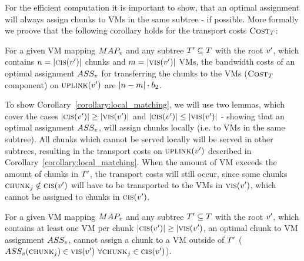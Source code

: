 For the efficient computation it is 
important to show, that an optimal assignment will always assign chunks to VMs 
in the same subtree - if possible. More formally we proove that the following 
corollary holds for the transport costs $\textsc{Cost}_T$:  

\begin{corollary}
\label{corollary:local_matching}
For a given VM mapping $MAP_v$ and any subtree $T' \subseteq 
T$ with the root $v'$, which contains $n = 
|\textsc{cis}(v')|$ chunks and $m = |\textsc{vis}(v')|$ 
VMs, the bandwidth costs of an optimal assignment $ASS_v$ for 
transferring the chunks to the VMs ($\textsc{Cost}_T$ 
component) on $\textsc{uplink}(v')$ are $|n 
- m| \cdot b_2$.
\end{corollary}

To show Corollary~\ref{corollary:local_matching}, we will use two lemmas, which 
cover the cases $|\textsc{cis}(v')| \geq 
|\textsc{vis}(v')|$ and $|\textsc{cis}(v')| \leq 
|\textsc{vis}(v')|$ - showing that an optimal assignment 
$ASS_v$, will assign chunks locally (i.e. to VMs in the 
same subtree). All chunks which cannot be served locally will be served in 
other subtrees, resulting in the transport costs on $\textsc{uplink}(v')$ 
described in Corollary~\ref{corollary:local_matching}. When the amount of VM 
exceeds the amount of chunks in $T'$, the transport costs will still occur, 
since some chunks $\textsc{chunk}_j \notin \textsc{cis}(v')$ will have to 
be transported to the VMs in $\textsc{vis}(v')$, which cannot be 
assigned to chunks in $\textsc{cis}(v')$.

\begin{lemma}
\label{lemma:matching1}
For a given VM mapping $MAP_v$ and any subtree $T' \subseteq 
T$ with the root $v'$, which contains at least one VM per 
chunk $|\textsc{cis}(v')| \geq |\textsc{vis}(v')$, an 
optimal chunk to VM assignment $ASS_v$, cannot assign a chunk 
to a VM outside of $T'$ ($ASS_v(\textsc{chunk}_j) \in 
\textsc{vis}(v')~ \forall \textsc{chunk}_j \in \textsc{cis}(v')$).
\end{lemma}

